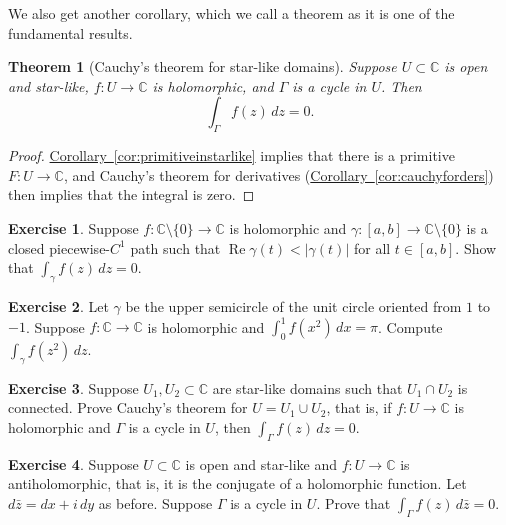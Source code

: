 \documentclass[12pt,openany]{book}
\renewcommand{\Re}{\operatorname{Re}}
\newcommand{\sabs}[1]{\lvert {#1} \rvert}
\newcommand{\C}{{\mathbb{C}}}
\theoremstyle{plain}
\newtheorem{thm}{Theorem}[section]
\theoremstyle{remark}
\theoremstyle{definition}
\newenvironment{exbox}{%
    \def\FrameCommand{\vrule width 1pt \relax\hspace{10pt}}%
    \MakeFramed{\advance\hsize-\width\FrameRestore}%
}{%
    \endMakeFramed
}
\theoremstyle{exercise}
\newtheorem{exercise}{Exercise}[section]
\theoremstyle{example}
\newcommand{\corref}[1]{\hyperref[#1]{Corollary~\ref*{#1}}}
\begin{document}
We also get another corollary, which we call
a theorem as it is one of the fundamental results.

\begin{thm}[Cauchy's theorem for star-like domains]
%
Suppose $U \subset \C$ is open and star-like, $f \colon U \to \C$ is holomorphic,
and $\Gamma$ is
a cycle
in $U$.  Then
\begin{equation*}
\int_{\Gamma} f(z) \, dz = 0 .
\end{equation*}
\end{thm}

\begin{proof}
\corref{cor:primitiveinstarlike} implies that there is
a primitive $F \colon U \to \C$, and
Cauchy's theorem for derivatives (\corref{cor:cauchyforders}) then implies that the integral is zero.
\end{proof}

\begin{exbox}
\begin{exercise}
Suppose $f \colon \C \setminus \{ 0 \} \to \C$ is holomorphic
and
$\gamma \colon [a,b] \to \C \setminus \{ 0 \}$ is a closed piecewise-$C^1$ path
such that $\Re \gamma(t) < \sabs{\gamma(t)}$ for all $t \in [a,b]$.
Show that $\int_\gamma f(z) \, dz = 0$.
\end{exercise}

\begin{exercise}
Let $\gamma$ be the upper semicircle of the unit circle oriented from $1$ to
$-1$.   Suppose $f \colon \C \to \C$ is holomorphic
and $\int_0^1 f(x^2) \, dx = \pi$.
Compute $\int_\gamma f(z^2) \, dz$.
\end{exercise}

\begin{exercise}
Suppose $U_1, U_2 \subset \C$ are star-like domains such that $U_1 \cap U_2$
is connected.  Prove Cauchy's theorem for $U = U_1 \cup U_2$, that is,
if $f \colon U \to \C$ is holomorphic and $\Gamma$ is a cycle in $U$,
then $\int_\Gamma f(z) \, dz = 0$.
\end{exercise}

\begin{exercise}
Suppose $U \subset \C$ is open and star-like and
$f \colon U \to \C$ is antiholomorphic, that is, it is the conjugate of a
holomorphic function.  Let $d\bar{z} = dx + i \, dy$ as before.  Suppose
$\Gamma$ is a cycle in $U$.  Prove that
$\int_\Gamma f(z) \, d\bar{z} = 0$.
\end{exercise}
\end{exbox}
\end{document}
